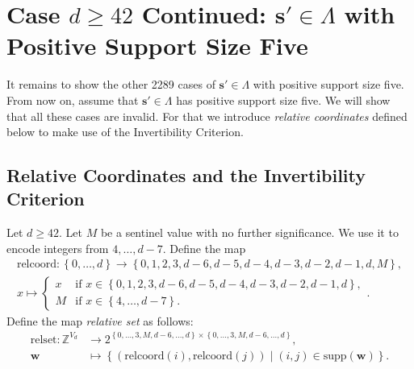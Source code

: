 \section{Case \( d \geq 42\) Continued: \( \mathbf{s}' \in \Lambda\) with Positive Support Size Five}

It remains to show the other 2289 cases of \( \mathbf{s}' \in \Lambda \) with positive support size five. From now on, assume that \( \mathbf{s}' \in \Lambda \) has positive support size five. We will show that all these cases are invalid. For that we introduce \emph{relative coordinates} defined below to make use of the Invertibility Criterion.

\subsection{Relative Coordinates and the Invertibility Criterion}

\begin{definition}
    Let \( d \geq 42 \).
    Let \( M \) be a sentinel value with no further significance. We use it to encode integers from \( 4, \dots, d-7 \). Define the map 
    \begin{align*}
        \mathrm{relcoord}: \left\{ 0, \dots, d \right\} \to \left\{ 0,1,2,3,d-6,d-5,d-4,d-3,d-2,d-1,d,M \right\}, \\
        x \mapsto \begin{cases}
            x & \text{if } x \in \left\{ 0,1,2,3, d-6,d-5,d-4,d-3,d-2,d-1,d \right\}, \\
            M& \text{if } x \in \left\{ 4, \dots, d-7 \right\}.
        \end{cases}.
    \end{align*}
    Define the map \emph{relative set} as follows:
    \begin{align*}
        \mathrm{relset}: \mathbb{Z}^{V_d} &\to 2^{\left\{ 0, \dots, 3, M, d-6, \dots, d \right\} \times \left\{ 0, \dots, 3, M, d-6, \dots, d \right\}}, \\
        \mathbf{w} &\mapsto \left\{ (\mathrm{relcoord}(i), \mathrm{relcoord}(j)) \mid (i,j) \in \mathrm{supp}(\mathbf{w}) \right\}.
    \end{align*}
\end{definition}

